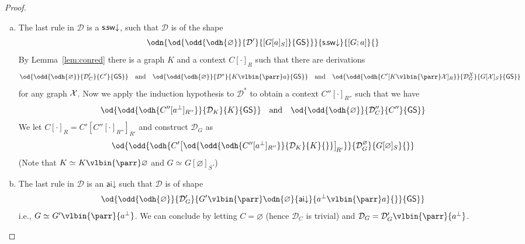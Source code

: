 \documentclass{lmcs} %
\newcommand{\isom}[1][]{\simeq_{#1}}
\renewcommand{\emptyset}{\varnothing}
\def\unit{\emptyset}
\def\GS{\mathsf{GS}}
\newcommand{\coons}[2]{[#1]_{#2}}														%
\newcommand{\Coons}[2]{\!\begin{bmatrix}#1\end{bmatrix}_{\!#2}}  						%
\newcommand{\coonso}[1]{[\cdot]_{#1}}
\newcommand{\quand}{\quad\mbox{and}\quad}
\def\aidr{\dairule}
\def\ssdr{\dssrule}
\def\ods#1#2#3#4{\od{\odd{\odh{#1}}{#2}{#3}{#4}}}
\def\cneg#1{{#1^\bot}}
\def\lpar{\vlbin{\parr}}
\def\airule{\mathsf{ai}}
\def\dairule{\airule\mathord{\downarrow}}
\def\ssrule{\mathsf{s\mkern-1mu.\mkern-1mu sw}}
\def\dssrule{\ssrule\mathord{\downarrow}}
\def\gC{C}
\def\gG{G}
\def\gK{K}
\newcommand{\dD}{\mathcal{D}}
\theoremstyle{plain}
\begin{document}
\begin{proof}
\begin{enumerate}[(a)]
		\item 
		The last rule in $\dD$ is a $\ssdr$, such that $\dD$ is of the shape
		\begin{equation*}
			\odn{\ods{\unit}{
					\dD'}{[\gG\coons{a}S]}{\GS}}{
				\ssdr}{[\gG;a]}{}
		\end{equation*}
		By Lemma~\ref{lem:conred}
		there is a graph $\gK$ and a
		context $\gC\coonso R$ such that there are derivations
		\begin{equation*}
			\ods{\unit}{\dD_C'}{\gC'}{\GS}
			\quand
			\ods{\unit}{\dD^\ast}{\gK \lpar a}{\GS}
			\quand
			\ods{\gC'\coons{\gK\lpar\XXX}R}{\dD_G^X}{\gG\coons{\XXX}S}{\GS}
		\end{equation*}
		for any graph ${\mathcal X}$. Now we apply the induction hypothesis to $\dD^\ast$ to obtain
                a context $\gC''\coonso{R''}$ such that we have
                \begin{equation*}
                  \ods{\gC''\coons{\cneg a}{R''}}{\dD_\gK}{\gK}{\GS}
                  \quand
                  \ods{\unit}{\dD_C''}{\gC''}{\GS}
                \end{equation*}
		We let $\gC\coonso{R}= \gC'\coons{\gC''\coonso{R''}}{R'}$  and construct $\dD_\gG$ as
		\begin{equation*}
		  \ods{\gC'\Coons{
                      \ods{\gC''\coons{\cneg a}{R''}}{\dD_\gK}{\gK}{}
                    }{R'}}{\dD_G^\unit}{\gG\coons{\unit}S}{}
		\end{equation*}
		(Note that $\gK\isom\gK\lpar\unit$ and $\gG\isom\gG\coons\unit S$.)
		
		
		\item The last rule in $\dD$ is an $\aidr$ such that $\dD$ is of shape
		\begin{equation*}
		  \ods{\unit}{\dD_{G}'}{\gG'\lpar\odn{\unit}{\aidr}{\cneg a\lpar a}{}}{\GS}
		\end{equation*}
                i.e., $\gG\isom\gG'\lpar\cneg a$.
		We can conclude by letting $\gC=\unit$ (hence $\dD_C$ is trivial) and $\dD_\gG=\dD_\gG'\lpar\cneg a$.
		
		
		

\end{enumerate}
\end{proof}
\end{document}
